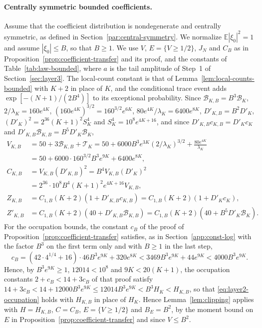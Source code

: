 \paragraph{Centrally symmetric bounded coefficients.}
Assume that the coefficient distribution is nondegenerate and centrally
symmetric, as defined in Section~\ref{par:central-symmetry}.
We normalize $\mathbb E|\xi_0|^2=1$ and assume $|\xi_0|\le B$, so that
$B\ge1$.
We use $V$, $E=\{V\ge1/2\}$, $J_N$ and $C_B$ as in
Proposition~\ref{prop:coefficient-transfer} and its proof, and the
constants of Table~\ref{tab:law-bounded}, where $a$ is the tail
amplitude of Step~1 of Section~\ref{sec:layer3}.
The local-count constant is that of Lemma~\ref{lem:local-counts-bounded}
with $K+2$ in place of $K$, and the conditional trace event adds
$\exp[-(N+1)/(2B^4)]$ to its exceptional probability.
Since $\mathcal B_{K,B}=B^3\mathcal B_K$, $2/\lambda_K=160e^{4K}$,
$(160e^{4K})^{3/2}=160^{3/2}e^{6K}$, $80e^{4K}/\lambda_K=6400e^{8K}$,
$D'_{K,B}=B^2D'_K$, $(D'_K)^2=2^{36}(K+1)^2S_K^4$ and
$S_K^4=10^8e^{4K+16}$, and since $D'_{K,B}c_{K,B}=D'_Kc_K$ and
$D'_{K,B}\mathcal B_{K,B}=B^5D'_K\mathcal B_K$,
\begin{align*}
 V_{K,B}&=50+3\mathcal B_{K,B}+\mathcal T_K
 =50+6000B^3e^{3K}(2/\lambda_K)^{3/2}+\frac{80e^{4K}}{\lambda_K}\\
 &=50+6000\cdot160^{3/2}B^3e^{9K}+6400e^{8K},\\
 C_{K,B}&=V_{K,B}(D'_{K,B})^2=B^4V_{K,B}(D'_K)^2\\
 &=2^{36}\cdot10^8B^4(K+1)^2e^{4K+16}V_{K,B},\\
 Z_{K,B}&=C_{1,B}(K+2)(1+D'_{K,B}c_{K,B})=C_{1,B}(K+2)(1+D'_Kc_K),\\
 Z'_{K,B}&=C_{1,B}(K+2)(40+D'_{K,B}\mathcal B_{K,B})
 =C_{1,B}(K+2)(40+B^5D'_K\mathcal B_K).
\end{align*}
For the occupation bounds, the constant $c_B$ of the proof of
Proposition~\ref{prop:coefficient-transfer} satisfies, as in
Section~\ref{app:const-log} with the factor $B^3$ on the first term only
and with $B\ge1$ in the last step,
\[
 c_B=(42\cdot4^{1/4}+16)\cdot46B^3e^{9K}+320e^{8K}
 <3469B^3e^{9K}+44e^{9K}<4000B^3e^{9K}.
\]
Hence, by $B^3e^{9K}\ge1$, $12014<10^8$ and $9K<20(K+1)$, the occupation
constants $2+c_B<14+3c_B$ of that proof satisfy
$14+3c_B<14+12000B^3e^{9K}\le12014B^3e^{9K}<B^3H_K<H_{K,B}$, so that
\eqref{eq:layer2-occupation} holds with $H_{K,B}$ in place of $H_K$.
Hence Lemma~\ref{lem:clipping} applies with $H=H_{K,B}$, $C=C_B$,
$E=\{V\ge1/2\}$ and $B_E=B^2$, by the moment bound on $E$ in
Proposition~\ref{prop:coefficient-transfer} and since $V\le B^2$.
